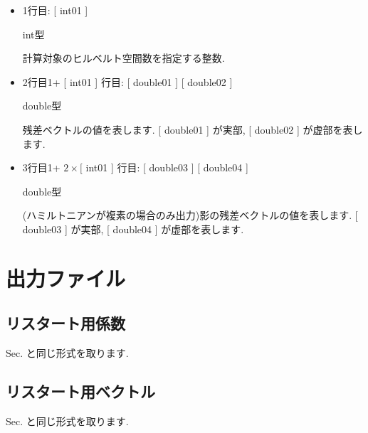 \documentclass[letterpaper,10pt,dvipdfmx,openany]{sphinxmanual}
\begin{document}
\begin{sphinxVerbatim}[commandchars=\\\{\}]
 
 
 
 
   
\end{sphinxVerbatim}
\begin{itemize}
\item {} 
1行目: {[} int01 {]}

 int型

 計算対象のヒルベルト空間数を指定する整数.

\item {} 
2行目\sphinxhyphen{}1+ {[} int01 {]} 行目:
{[} double01 {]} {[} double02 {]}

 double型

 残差ベクトルの値を表します.
{[} double01 {]} が実部, {[} double02 {]} が虚部を表します.

\item {} 
3行目\sphinxhyphen{}1+ \(2\times[\) int01 {]} 行目:
{[} double03 {]} {[} double04 {]}

 double型

(ハミルトニアンが複素の場合のみ出力)影の残差ベクトルの値を表します.
{[} double03 {]} が実部, {[} double04 {]} が虚部を表します.

\end{itemize}


\section{出力ファイル}
\label{\detokenize{shiftk_format_ja:id6}}

\subsection{リスタート用係数}
\label{\detokenize{shiftk_format_ja:id7}}
Sec. {\hyperref[\detokenize{shiftk_format_ja:recoeff}]{}} と同じ形式を取ります.


\subsection{リスタート用ベクトル}
\label{\detokenize{shiftk_format_ja:id8}}
Sec. {\hyperref[\detokenize{shiftk_format_ja:revec}]{}} と同じ形式を取ります.
\end{document}
